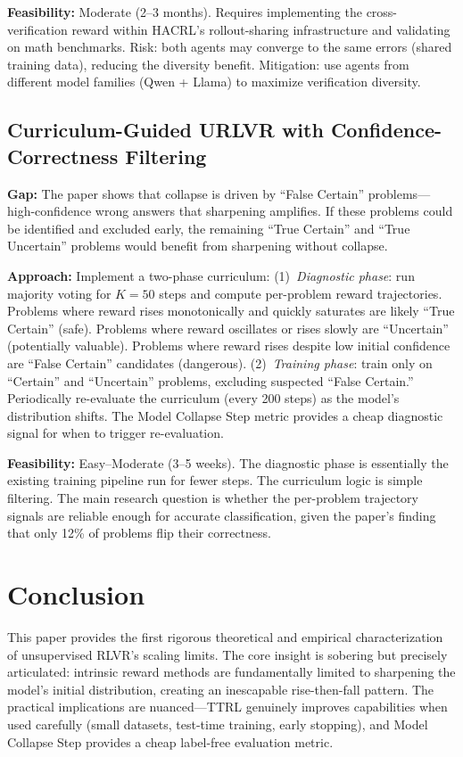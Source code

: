 \documentclass[11pt]{article}
\begin{document}
\textbf{Feasibility:} Moderate (2--3 months). Requires implementing the cross-verification reward within HACRL's rollout-sharing infrastructure and validating on math benchmarks. Risk: both agents may converge to the same errors (shared training data), reducing the diversity benefit. Mitigation: use agents from different model families (Qwen + Llama) to maximize verification diversity.

\subsection{Curriculum-Guided URLVR with Confidence-Correctness Filtering}

\textbf{Gap:} The paper shows that collapse is driven by ``False Certain'' problems---high-confidence wrong answers that sharpening amplifies. If these problems could be identified and excluded early, the remaining ``True Certain'' and ``True Uncertain'' problems would benefit from sharpening without collapse.

\textbf{Approach:} Implement a two-phase curriculum: (1)~\emph{Diagnostic phase}: run majority voting for $K{=}50$ steps and compute per-problem reward trajectories. Problems where reward rises monotonically and quickly saturates are likely ``True Certain'' (safe). Problems where reward oscillates or rises slowly are ``Uncertain'' (potentially valuable). Problems where reward rises despite low initial confidence are ``False Certain'' candidates (dangerous). (2)~\emph{Training phase}: train only on ``Certain'' and ``Uncertain'' problems, excluding suspected ``False Certain.'' Periodically re-evaluate the curriculum (every 200 steps) as the model's distribution shifts. The Model Collapse Step metric provides a cheap diagnostic signal for when to trigger re-evaluation.

\textbf{Feasibility:} Easy--Moderate (3--5 weeks). The diagnostic phase is essentially the existing training pipeline run for fewer steps. The curriculum logic is simple filtering. The main research question is whether the per-problem trajectory signals are reliable enough for accurate classification, given the paper's finding that only 12\% of problems flip their correctness.

\section{Conclusion}

This paper provides the first rigorous theoretical and empirical characterization of unsupervised RLVR's scaling limits. The core insight is sobering but precisely articulated: intrinsic reward methods are fundamentally limited to sharpening the model's initial distribution, creating an inescapable rise-then-fall pattern. The practical implications are nuanced---TTRL genuinely improves capabilities when used carefully (small datasets, test-time training, early stopping), and Model Collapse Step provides a cheap label-free evaluation metric.
\end{document}

